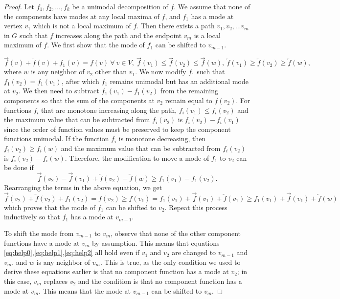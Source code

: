 \documentclass[11pt]{article}
\begin{document}
\begin{proof}
Let $f_1, f_2, \ldots, f_k$ be a unimodal decomposition of $f$. We assume that none of the components have modes at any local maxima of $f$, and $f_1$ has a mode at vertex $v_1$ which is not a local maximum of $f$. Then there exists a path $v_1, v_2, \ldots v_m$ in $G$ such that $f$ increases along the path and the endpoint $v_m$ is a local maximum of $f$. We first show that the mode of $f_1$ can be shifted to $v_{m-1}$.

\begin{equation}
\label{eq:help0}
	\overrightarrow{f}(v) + \overleftarrow{f}(v) + f_1(v) = f(v) \ \forall \ v \in V, \ \overrightarrow{f}(v_1) \leq \overrightarrow{f}(v_2) \leq \overrightarrow{f}(w), \ \overleftarrow{f}(v_1) \geq \overleftarrow{f}(v_2) \geq \overleftarrow{f}(w),
\end{equation}
where $w$ is any neighbor of $v_2$ other than $v_1$. We now modify $f_1$ such that $f_1(v_2) = f_1(v_1)$, after which $f_1$ remains unimodal but has an additional mode at $v_2$. We then need to subtract $f_1(v_1)-f_1(v_2)$ from the remaining components so that the sum of the components at $v_2$ remain equal to $f(v_2)$. For functions $f_i$ that are monotone increasing along the path, $f_i(v_1) \leq f_i(v_2)$ and the maximum value that can be subtracted from $f_i(v_2)$ is $f_i(v_2)-f_i(v_1)$ since the order of function values must be preserved to keep the component functions unimodal. If the function $f_i$ is monotone decreasing, then $f_i(v_2) \geq f_i(w)$ and the maximum value that can be subtracted from $f_i(v_2)$ is $f_i(v_2)-f_i(w)$. Therefore, the modification to move a mode of $f_1$ to $v_2$ can be done if
\begin{equation}
\label{eq:help1}
	\overrightarrow{f}(v_2) - \overrightarrow{f}(v_1) + \overleftarrow{f}(v_2) - \overleftarrow{f}(w) \geq f_1(v_1) - f_1(v_2).
\end{equation}
Rearranging the terms in the above equation, we get
\begin{equation}
\label{eq:help2}
	\overrightarrow{f}(v_2) + \overleftarrow{f}(v_2) + f_1(v_2) = f(v_2) \geq f(v_1) = f_1(v_1)  + \overrightarrow{f}(v_1) + \overleftarrow{f}(v_1) \geq f_1(v_1)  + \overrightarrow{f}(v_1) + \overleftarrow{f}(w)
\end{equation}
which proves that the mode of $f_1$ can be shifted to $v_2$. Repeat this process inductively so that $f_1$ has a mode at $v_{m-1}$.

To shift the mode from $v_{m-1}$ to $v_m$, observe that none of the other component functions have a mode at $v_m$ by assumption. This means that equations \eqref{eq:help0},\eqref{eq:help1},\eqref{eq:help2} all hold even if $v_1$ and $v_2$ are changed to $v_{m-1}$ and $v_m$, and $w$ is any neighbor of $v_m$. This is true, as the only condition we used to derive these equations earlier is that no component function has a mode at $v_2$; in this case, $v_m$ replaces $v_2$ and the condition is that no component function has a mode at $v_m$. This means that the mode at $v_{m-1}$ can be shifted to $v_m$.
\end{proof}
\fi
\end{document}
